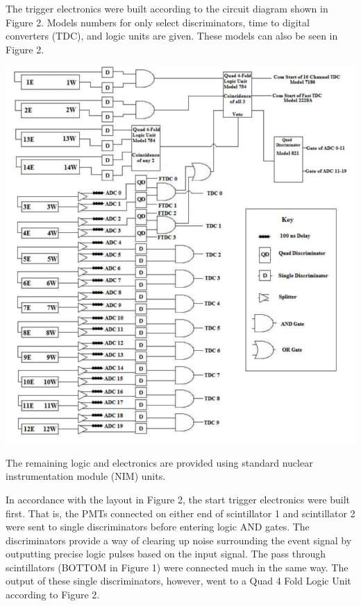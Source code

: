 \documentclass{article}
\begin{document}
The trigger electronics were built according to the circuit diagram shown in Figure 2. Models numbers for only select discriminators, time to digital converters (TDC), and logic units are given. These models can also be seen in Figure 2. 

\begin{center}

    \vspace{5mm}
    
    \includegraphics[width = \textwidth]{Figure2.png}

    
    \vspace{5mm}

\end{center}

The remaining logic and electronics are provided using standard nuclear instrumentation module (NIM) units.

In accordance with the layout in Figure 2, the start trigger electronics were built first. That is, the PMTs connected on either end of scintillator 1 and scintillator 2 were sent to single discriminators before entering logic AND gates. The discriminators provide a way of clearing up noise surrounding the event signal by outputting precise logic pulses based on the input signal. The pass through scintillators (BOTTOM in Figure 1) were connected much in the same way. The output of these single discriminators, however, went to a Quad 4 Fold Logic Unit according to Figure 2.
\end{document}
